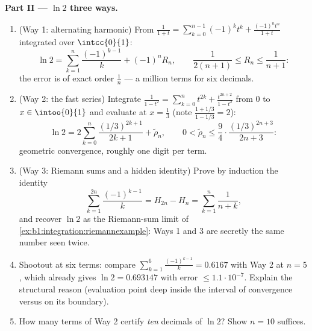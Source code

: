 \begin{problem}
\medskip
\noindent\textbf{Part II --- $\ln 2$ three ways.}
\begin{enumerate}[resume]
  \item (Way 1: alternating harmonic) From $\frac{1}{1+t} =
        \sum_{k=0}^{n-1}(-1)^k t^k + \frac{(-1)^n t^n}{1+t}$
        integrated over $\intcc{0}{1}$:
        \[
        \ln 2 = \sum_{k=1}^{n} \frac{(-1)^{k-1}}{k} + (-1)^n
        R_n, \qquad \frac{1}{2(n+1)} \leq R_n \leq
        \frac{1}{n+1} :
        \]
        the error is of exact order $\frac 1n$ --- a million
        terms for six decimals.
  \item (Way 2: the fast series) Integrate $\frac{1}{1 - t^2} =
        \sum_{k=0}^{n} t^{2k} + \frac{t^{2n+2}}{1-t^2}$ from $0$
        to $x \in \intoo{0}{1}$ and evaluate at $x = \frac13$
        (note $\frac{1 + 1/3}{1 - 1/3} = 2$):
        \[
        \ln 2 = 2\sum_{k=0}^{n} \frac{(1/3)^{2k+1}}{2k+1} +
        \tilde\rho_n,
        \qquad
        0 < \tilde\rho_n \leq \frac{9}{4}\cdot
        \frac{(1/3)^{2n+3}}{2n+3} :
        \]
        geometric convergence, roughly one digit per term.
  \item (Way 3: Riemann sums and a hidden identity) Prove by
        induction the identity
        \[
        \sum_{k=1}^{2n} \frac{(-1)^{k-1}}{k} = H_{2n} - H_n =
        \sum_{k=1}^{n} \frac{1}{n + k} ,
        \]
        and recover $\ln 2$ as the Riemann-sum limit of
        \cref{ex:b1:integration:riemannexample}: Ways 1 and 3
        are secretly the same number seen twice.
  \item Shootout at six terms: compare $\sum_{k=1}^{6}
        \frac{(-1)^{k-1}}{k} = 0.6167$ with Way 2 at $n = 5$,
        which already gives $\ln 2 = 0.693147$ with error $\leq
        1.1\cdot10^{-7}$. Explain the structural reason
        (evaluation point deep inside the interval of
        convergence versus on its boundary).
  \item How many terms of Way 2 certify \emph{ten} decimals of
        $\ln 2$? Show $n = 10$ suffices.
\end{enumerate}


\end{problem}
